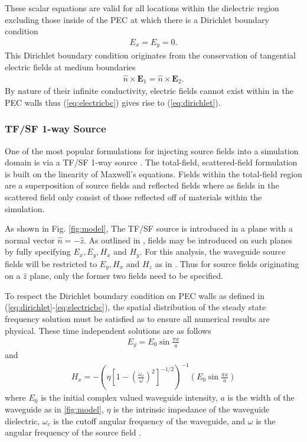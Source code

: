 These scalar equations are valid for all locations within the dielectric region excluding those inside of the PEC at which there is a Dirichlet boundary condition
\begin{align}
	E_x=E_y=0.
	\label{eq:dirichlet}
\end{align}
This Dirichlet boundary condition originates from the conservation of tangential electric fields at medium boundaries 
\begin{align}
	\hat{n}\times\textbf{E}_1=\hat{n}\times\textbf{E}_2.
	\label{eq:electricbc}
\end{align}
By nature of their infinite conductivity, electric fields cannot exist within in the PEC walls thus  (\ref{eq:electricbc}) gives rise to  (\ref{eq:dirichlet}).

\subsubsection{TF/SF 1-way Source}
\label{subsubsec:ftsf-mod}
One of the most popular formulations for injecting source fields into a simulation domain is via a TF/SF 1-way source \cite{taftlovefdtd}. The total-field, scattered-field formulation is built on the linearity of Maxwell's equations. Fields within the total-field region are a superposition of source fields and reflected fields where as fields in the scattered field only consist of those reflected off of materials within the simulation.

As shown in Fig. \ref{fig:model}, The TF/SF source is introduced in a plane with a normal vector $\hat{n}=-\hat{z}$. As outlined in \cite{taftlovefdtd}, fields may be introduced on such planes by fully specifying $E_x, E_y, H_x$ and $H_y$. For this analysis, the waveguide source fields will be restricted to $E_y, H_x$ and $H_z$ as in \cite{fieldsandwavescomm}. Thus for source fields originating on a $\hat{z}$ plane, only the former two fields need to be specified. 

To respect the Dirichlet boundary condition on PEC walls as defined in   (\ref{eq:dirichlet}-\ref{eq:electricbc}), the spatial distribution of the steady state frequency solution must be satisfied as to ensure all numerical results are physical. These time independent solutions are as follows
\begin{align}
	E_y=E_0\sin{\frac{\pi x}{a}}
	\label{eq:eyfreq}
\end{align}
and
\begin{align}
	H_x = -\left(\eta\left[1-\left(\frac{\omega_c}{\omega}\right)^2\right]^{-1/2}\right)^{-1}\left(E_0\sin{\frac{\pi x}{a}}\right)
	\label{eq:hxfreq}
\end{align}
where $E_0$ is the initial complex valued waveguide intensity, $a$ is the width of the waveguide as in \ref{fig:model}, $\eta$ is the intrinsic impedance of the waveguide dielectric, $\omega_c$ is the cutoff angular frequency of the waveguide, and $\omega$ is the angular frequency of the source field \cite{fieldsandwavescomm}.

